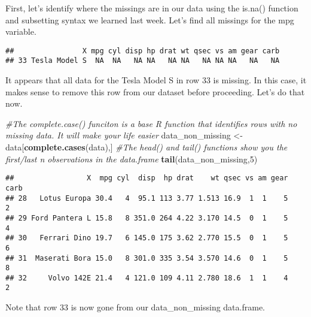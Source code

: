 \documentclass[]{article}
\newenvironment{Shaded}{\begin{snugshade}}{\end{snugshade}}
\newcommand{\KeywordTok}[1]{\textcolor[rgb]{0.13,0.29,0.53}{\textbf{#1}}}
\newcommand{\DecValTok}[1]{\textcolor[rgb]{0.00,0.00,0.81}{#1}}
\newcommand{\StringTok}[1]{\textcolor[rgb]{0.31,0.60,0.02}{#1}}
\newcommand{\CommentTok}[1]{\textcolor[rgb]{0.56,0.35,0.01}{\textit{#1}}}
\newcommand{\OperatorTok}[1]{\textcolor[rgb]{0.81,0.36,0.00}{\textbf{#1}}}
\newcommand{\NormalTok}[1]{#1}
\begin{document}
First, let's identify where the missings are in our data using the
is.na() function and subsetting syntax we learned last week. Let's find
all missings for the mpg variable.

\begin{Shaded}
\end{Shaded}

\begin{verbatim}
##                X mpg cyl disp hp drat wt qsec vs am gear carb
## 33 Tesla Model S  NA  NA   NA NA   NA NA   NA NA NA   NA   NA
\end{verbatim}

It appears that all data for the Tesla Model S in row 33 is missing. In
this case, it makes sense to remove this row from our dataset before
proceeding. Let's do that now.

\begin{Shaded}
\begin{Highlighting}[]
\CommentTok{#The complete.case() funciton is a base R function that identifies rows with no missing data. It will make your life easier}
\NormalTok{data_non_missing <-}\StringTok{ }\NormalTok{data[}\KeywordTok{complete.cases}\NormalTok{(data),]}
\CommentTok{#The head() and tail() functions show you the first/last n observations in the data.frame}
\KeywordTok{tail}\NormalTok{(data_non_missing,}\DecValTok{5}\NormalTok{)}
\end{Highlighting}
\end{Shaded}

\begin{verbatim}
##                 X  mpg cyl  disp  hp drat    wt qsec vs am gear carb
## 28   Lotus Europa 30.4   4  95.1 113 3.77 1.513 16.9  1  1    5    2
## 29 Ford Pantera L 15.8   8 351.0 264 4.22 3.170 14.5  0  1    5    4
## 30   Ferrari Dino 19.7   6 145.0 175 3.62 2.770 15.5  0  1    5    6
## 31  Maserati Bora 15.0   8 301.0 335 3.54 3.570 14.6  0  1    5    8
## 32     Volvo 142E 21.4   4 121.0 109 4.11 2.780 18.6  1  1    4    2
\end{verbatim}

Note that row 33 is now gone from our data\_non\_missing data.frame.
\end{document}
